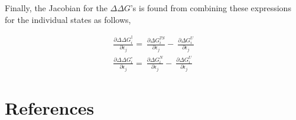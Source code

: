 \documentclass[preprint]{elsarticle}
\begin{document}
Finally, the Jacobian for the $\Delta\Delta G$'s is found from combining these
expressions for the individual states as follows,

\begin{align}
\label{eq:ddGs}
    \frac{\partial \Delta\Delta G^{\ddagger}_i}{\partial\epsilon_j} = \
    \frac{\partial \Delta G^{TS}_i}{\partial\epsilon_j} - \
    \frac{\partial \Delta G^{U}_i}{\partial\epsilon_j}  \\
    \frac{\partial \Delta\Delta G^{\circ}_i}{\partial\epsilon_j} = \
    \frac{\partial \Delta G^{N}_i}{\partial\epsilon_j} - \
    \frac{\partial \Delta G^{U}_i}{\partial\epsilon_j} 
\end{align}


\section*{References}


\end{document}
